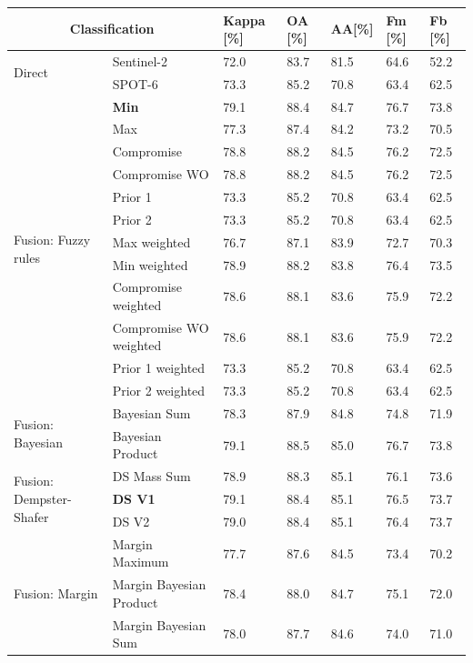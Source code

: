 \documentclass[10pt]{article}
\begin{document}
\begin{table}[H]
\centering
\begin{tabular}{p{1.8cm}llllll}\toprule
\multicolumn{2}{c}{\textbf{Classification}}& \textbf{Kappa} [\%] & \textbf{OA} [\%] & \textbf{AA}[\%] & \textbf{Fm} [\%] & \textbf{Fb} [\%]\\\hline
\multirow{2}{*}{Direct}& Sentinel-2 & 72.0 & 83.7 & 81.5 & 64.6 & 52.2 \\
& SPOT-6 & 73.3 & 85.2 & 70.8 & 63.4 & 62.5 \\\hline

\multirow{12}{*}{\parbox{1.8cm}{Fusion: Fuzzy rules}}& \textbf{Min} & 79.1 & 88.4 & 84.7 & 76.7 & 73.8 \\
& Max & 77.3 & 87.4 & 84.2 & 73.2 & 70.5 \\
& Compromise & 78.8 & 88.2 & 84.5 & 76.2 & 72.5 \\
& Compromise WO & 78.8 & 88.2 & 84.5 & 76.2 & 72.5 \\
& Prior 1 & 73.3 & 85.2 & 70.8 & 63.4 & 62.5 \\
& Prior 2 & 73.3 & 85.2 & 70.8 & 63.4 & 62.5 \\
& Max weighted & 76.7 & 87.1 & 83.9 & 72.7 & 70.3 \\
& Min weighted & 78.9 & 88.2 & 83.8 & 76.4 & 73.5 \\
& Compromise weighted & 78.6 & 88.1 & 83.6 & 75.9 & 72.2 \\
& Compromise WO weighted & 78.6 & 88.1 & 83.6 & 75.9 & 72.2 \\
& Prior 1 weighted & 73.3 & 85.2 & 70.8 & 63.4 & 62.5 \\
& Prior 2 weighted & 73.3 & 85.2 & 70.8 & 63.4 & 62.5 \\\hline
\multirow{2}{*}{\parbox{1.8cm}{Fusion: Bayesian}}& Bayesian Sum & 78.3 & 87.9 & 84.8 & 74.8 & 71.9 \\
& Bayesian Product & 79.1 & 88.5 & 85.0 & 76.7 & 73.8 \\\hline
\multirow{3}{*}{\parbox{1.8cm}{Fusion: Dempster-Shafer}}& DS Mass Sum  & 78.9 & 88.3 & 85.1 & 76.1 & 73.6 \\
& \textbf{DS V1} & 79.1 & 88.4 & 85.1 & 76.5 & 73.7 \\
& DS V2 & 79.0 & 88.4 & 85.1 & 76.4 & 73.7 \\\hline
\multirow{3}{*}{\parbox{1.8cm}{Fusion: Margin}}& Margin Maximum & 77.7 & 87.6 & 84.5 & 73.4 & 70.2 \\
& Margin Bayesian Product  & 78.4 & 88.0 & 84.7 & 75.1 & 72.0 \\
& Margin Bayesian Sum & 78.0 & 87.7 & 84.6 & 74.0 & 71.0 \\\hline

\end{tabular}
\end{table}
\end{document}
